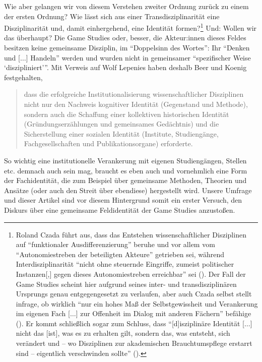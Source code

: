 \documentclass{scrartcl}
\begin{document}
Wie aber gelangen wir von diesem Verstehen zweiter Ordnung zurück zu einem der ersten Ordnung?
Wie lässt sich aus einer Transdisziplinarität eine Disziplinarität und, damit einhergehend, eine Identität formen?\footnote{Roland Czada führt aus, dass das Entstehen wissenschaftlicher Disziplinen auf \enquote{funktionaler Ausdifferenzierung} beruhe und vor allem vom \enquote{Autonomiestreben der beteiligten Akteure} getrieben sei, während Interdisziplinarität \enquote{nicht ohne steuernde Eingriffe, zumeist politischer Instanzen[,] gegen dieses Autonomiestreben erreichbar} sei (\autocite[][S.~23]{czada_disziplinare_2002}). Der Fall der Game Studies scheint hier aufgrund seines inter- und transdisziplinären Ursprungs genau entgegengesetzt zu verlaufen, aber auch Czada selbst stellt infrage, ob wirklich \enquote{nur ein hohes Maß der Selbstgewissheit und Verankerung im eigenen Fach [$\ldots$] zur Offenheit im Dialog mit anderen Fächern} befähige (\autocite[][S.~30]{czada_disziplinare_2002}). Er kommt schließlich sogar zum Schluss, dass \enquote{[d]isziplinäre Identität [$\ldots$] nicht das [ist], was es zu erhalten gilt, sondern das, was entsteht, sich verändert und -- wo Disziplinen zur akademischen Brauchtumspflege erstarrt sind -- eigentlich verschwinden sollte} (\autocite[][S.~51]{czada_disziplinare_2002}).}
Und:
Wollen wir das überhaupt?
Die Game Studies oder, besser, die Akteur:innen dieses Feldes besitzen keine gemeinsame Disziplin, im \enquote{Doppelsinn des Wortes}:\autocite[][S.~12]{guntau_einleitung_2021}
Ihr \enquote{Denken und [$\ldots$] Handeln} werden und wurden nicht in gemeinsamer \enquote{spezifischer Weise \enquote{diszipliniert}}.\autocite[][S.~12]{guntau_einleitung_2021}
Mit Verweis auf Wolf Lepenies haben deshalb Beer und Koenig festgehalten,

\begin{quote}
   dass die erfolgreiche Institutionalisierung wissenschaftlicher Disziplinen nicht nur den Nachweis kognitiver Identität (Gegenstand und Methode), sondern auch die Schaffung einer kollektiven historischen Identität (Gründungserzählungen und gemeinsames Gedächtnis) und die Sicherstellung einer sozialen Identität (Institute, Studiengänge, Fachgesellschaften und Publikationsorgane) erforderte.\autocite[][S.~5]{beer_grenzziehungen_2009}
\end{quote}

So wichtig eine institutionelle Verankerung mit eigenen Studiengängen, Stellen etc. demnach auch sein mag, braucht es eben auch und vornehmlich eine Form der Fachidentität, die zum Beispiel über gemeinsame Methoden, Theorien und Ansätze (oder auch den Streit über ebendiese) hergestellt wird.
Unsere Umfrage und dieser Artikel sind vor diesem Hintergrund somit ein erster Versuch, den Diskurs über eine gemeinsame Feldidentität der Game Studies anzustoßen.
\end{document}
